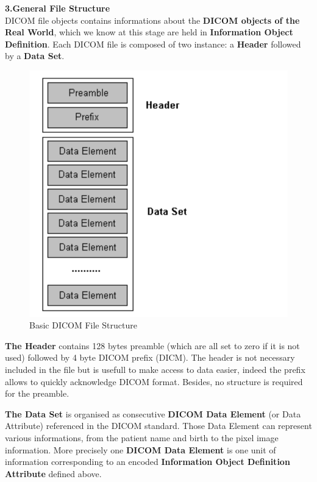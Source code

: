 \clearpage

\textbf{3.General File Structure}\\
\newline
DICOM file objects contains informations about the \textbf{DICOM objects of the Real World}, which we know at this stage are held in \textbf{Information Object Definition}. Each DICOM file is composed of two instance: a \textbf{Header} followed by a \textbf{Data Set}.

\begin{figure}[ht]
\centering
\includegraphics[width = 0.5\hsize]{./figures/DicomFileFormat}
\caption{Basic DICOM File Structure}
\end{figure}


\textbf{The Header} contains 128 bytes preamble (which are all set to zero if it is not used) followed by 4 byte DICOM prefix (DICM). The header is not necessary included in the file but is usefull to make access to data easier, indeed the prefix allows to quickly acknowledge DICOM format. Besides, no structure is required for the preamble.  

\newline \vspace{5mm}
\textbf{The Data Set} is organised as consecutive \textbf{DICOM Data Element} (or Data Attribute) referenced in the DICOM standard. Those Data Element can represent various informations, from the patient name and birth to the pixel image information. More precisely one \textbf{DICOM Data Element} is one unit of information corresponding to an encoded \textbf{Information Object Definition Attribute} defined above.

